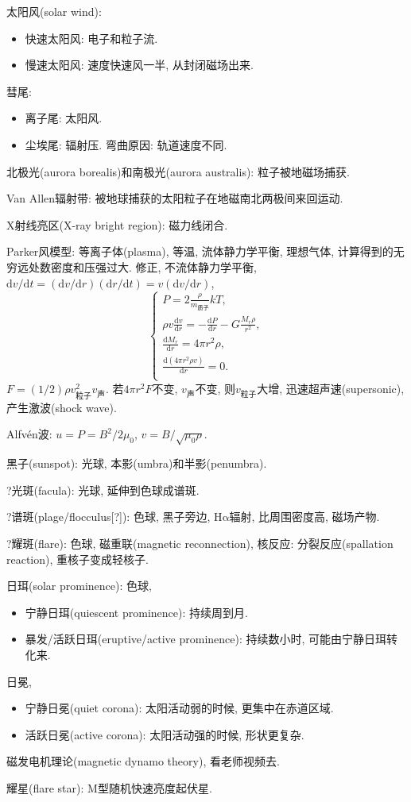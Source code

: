 太阳风(solar wind):
\begin{itemize}
    \item 快速太阳风: 电子和粒子流.
    \item 慢速太阳风: 速度快速风一半, 从封闭磁场出来.
\end{itemize}

彗尾:
\begin{itemize}
    \item 离子尾: 太阳风.
    \item 尘埃尾: 辐射压. 弯曲原因: 轨道速度不同.
\end{itemize}

北极光(aurora borealis)和南极光(aurora australis): 粒子被地磁场捕获.

Van Allen辐射带: 被地球捕获的太阳粒子在地磁南北两极间来回运动.

X射线亮区(X-ray bright region): 磁力线闭合.

Parker风模型: 等离子体(plasma), 等温, 流体静力学平衡, 理想气体, 计算得到的无穷远处数密度和压强过大. 修正, 不流体静力学平衡, $\mathrm{d}v/\mathrm{d}t=(\mathrm{d}v/\mathrm{d}r)(\mathrm{d}r/\mathrm{d}t)=v(\mathrm{d}v/\mathrm{d}r)$,
\begin{equation*}
    \begin{cases}
        P = 2\frac{\rho}{m_\text{质子}}kT, \\
        \rho v \frac{\mathrm{d}v}{\mathrm{d}r}=-\frac{\mathrm{d}P}{\mathrm{d}r}-G\frac{M_r\rho}{r^2}, \\
        \frac{\mathrm{d}M_r}{\mathrm{d}r}=4\pi r^2\rho, \\
        \frac{\mathrm{d}(4\pi r^2\rho v)}{\mathrm{d}r}=0. \\
    \end{cases}
\end{equation*}
$F=(1/2)\rho v_\text{粒子}^2v_\text{声}$. 若$4\pi r^2F$不变, $v_\text{声}$不变, 则$v_\text{粒子}$大增, 迅速超声速(supersonic), 产生激波(shock wave).

Alfv\'en波: $u=P=B^2/2\mu_0$, $v=B/\sqrt{\mu_0\rho}$.

黑子(sunspot): 光球, 本影(umbra)和半影(penumbra).

?光斑(facula): 光球, 延伸到色球成谱斑.

?谱斑(plage/flocculus[?]): 色球, 黑子旁边, H$\mathrm{\alpha}$辐射, 比周围密度高, 磁场产物.

?耀斑(flare): 色球, 磁重联(magnetic reconnection), 核反应: 分裂反应(spallation reaction), 重核子变成轻核子.

日珥(solar prominence): 色球,
\begin{itemize}
    \item 宁静日珥(quiescent prominence): 持续周到月.
    \item 暴发/活跃日珥(eruptive/active prominence): 持续数小时, 可能由宁静日珥转化来.
\end{itemize}

日冕,
\begin{itemize}
    \item 宁静日冕(quiet corona): 太阳活动弱的时候, 更集中在赤道区域.
    \item 活跃日冕(active corona): 太阳活动强的时候, 形状更复杂.
\end{itemize}

磁发电机理论(magnetic dynamo theory), 看老师视频去.

耀星(flare star): M型随机快速亮度起伏星.
